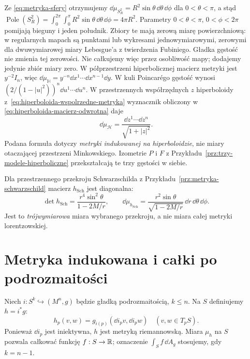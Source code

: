 \begin{przyklad}
Ze \eqref{eq:metryka-sfery} otrzymujemy
$\dd\mu_{S_R^2}=R^2\sin\theta\,
\dd\theta\,\dd\phi$ dla $0<\theta<\pi$,
a stąd
$\operatorname{Pole}(S_R^2)
=\int_0^{2\pi}\int_0^\pi
R^2\sin\theta\,\dd\theta\,\dd\phi=4\pi R^2$.
Parametry $0<\theta<\pi$, $0<\phi<2\pi$ pomijają
bieguny i jeden południk. Zbiory te mają zerową miarę
powierzchniową: w regularnych mapach są punktami lub
wykresami jednowymiarowymi, zerowymi dla dwuwymiarowej
miary Lebesgue'a z twierdzenia Fubiniego. Gładka gęstość
nie zmienia tej zerowości. Nie całkujemy więc przez
osobliwość mapy; dodajemy jedynie zbiór miary zero.
W półprzestrzeni hiperbolicznej macierz
metryki jest $y^{-2}I_n$, więc
$\dd\mu_{\mathbb H}=y^{-n}\dd x^1\cdots
\dd x^{n-1}\dd y$.
W kuli Poincarégo gęstość wynosi
$(2/(1-|u|^2))^n\dd u^1\cdots\dd u^n$.
W przestrzennych współrzędnych $z$ hiperboloidy
z~\eqref{eq:hiperboloida-wspolrzedne-metryka}
wyznacznik obliczony w
\eqref{eq:hiperboloida-macierz-odwrotna} daje
\[
 \dd\mu_{\mathcal H}
  =\frac{\dd z^1\cdots\dd z^n}{\sqrt{1+|z|^2}}.
\]
Podana formuła dotyczy \emph{metryki indukowanej
na hiperboloidzie}, nie miary otaczającej
przestrzeni Minkowskiego. Izometrie $P$ i $F$
z Przykładu~\ref{prz:trzy-modele-hiperboliczne}
przekształcają te trzy gęstości w siebie.

Dla przestrzennego przekroju Schwarzschilda
z Przykładu~\ref{prz:metryka-schwarzschild}
macierz $h_{\mathrm{Sch}}$ jest diagonalna:
\[
 \det h_{\mathrm{Sch}}
  =\frac{r^4\sin^2\theta}{1-2M/r},
 \qquad
 \dd\mu_{h_{\mathrm{Sch}}}
  =\frac{r^2\sin\theta}{\sqrt{1-2M/r}}\,
       \dd r\,\dd\theta\,\dd\phi.
\]
Jest to \emph{trójwymiarowa} miara wybranego
przekroju, a nie miara całej metryki lorentzowskiej.
\end{przyklad}

\section{Metryka indukowana i całki po podrozmaitości}
\label{sec:metryka-indukowana}

\begin{definicja}
\label{def:metryka-indukowana}
Niech $i:S^k\hookrightarrow(M^n,g)$ będzie
gładką podrozmaitością, $k\leq n$.
Na $S$ definiujemy $h=i^*g$:
\[
 h_p(v,w)=g_{i(p)}(\dd i_pv,\dd i_pw)
 \quad(v,w\in T_pS).
\]
Ponieważ $\dd i_p$ jest iniektywna, $h$ jest
metryką riemannowską. Miara $\mu_h$ na $S$
pozwala całkować funkcję $f:S\to\mathbb{R}$;
oznaczenie $\int_S f\,\dd A_g$ stosujemy,
gdy $k=n-1$.
\end{definicja}

